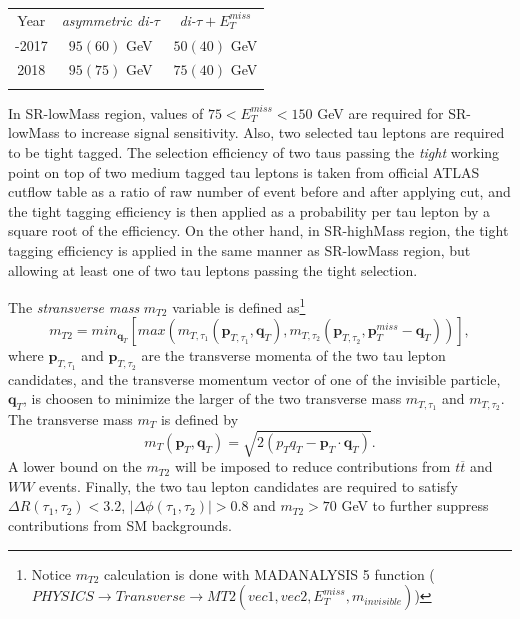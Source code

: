 \documentclass{ws-mpla}
\begin{document}
\begin{table}[h!]
  {\begin{tabular}{@{}c c c@{}} \toprule
  Year & \textit{asymmetric di-$\tau$} & \textit{di-$\tau +E^{miss}_T$} \\
  \colrule
 2015-2017 & $95(60)$ GeV & $50(40)$ GeV \\
 2018 & $95(75)$ GeV & $75(40)$ GeV \\ 
  \botrule
  \end{tabular}\label{tab:trig-eff} }
\end{table}

In SR-lowMass region, values of $75 < E^{miss}_T < 150$ GeV are required for SR-lowMass to increase signal sensitivity.
Also, two selected tau leptons are required to be tight tagged.
The selection efficiency of two taus passing the \textit{tight} working point on top of two medium tagged tau leptons is taken from official ATLAS cutflow table as a ratio of raw number of event before and after applying cut, and the tight tagging efficiency is then applied as a probability per tau lepton by a square root of the efficiency.
On the other hand, in SR-highMass region, the tight tagging efficiency is applied in the same manner as SR-lowMass region, but allowing at least one of two tau leptons passing the tight selection.

The \textit{stransverse mass} $m_{T2}$ variable is defined as\footnote{
Notice $m_{T2}$ calculation is done with MADANALYSIS 5 function ($PHYSICS\rightarrow Transverse\rightarrow MT2(vec1,vec2,E^{miss}_T,m_{invisible})$)
}
\begin{equation}
m_{T2} =min_{\mathbf{q}_T}
\left[
max(m_{T,\tau_1}(\mathbf{p}_{T,\tau_1},\mathbf{q}_T),m_{T,\tau_2}(\mathbf{p}_{T,\tau_2},\mathbf{p}^{miss}_T -\mathbf{q}_T))
\right],
\end{equation}   
where $\mathbf{p}_{T,\tau_1}$ and $\mathbf{p}_{T,\tau_2}$ are the transverse momenta of the two tau lepton candidates, and the transverse momentum vector of one of the invisible particle, $\mathbf{q}_T$, is choosen to minimize the larger of the two transverse mass $m_{T,\tau_1}$ and $m_{T,\tau_2}$. The transverse mass $m_T$ is defined by
\begin{equation}
m_{T}(\mathbf{p}_T,\mathbf{q}_T) = \sqrt{2(p_T q_T -\mathbf{p}_T\cdot\mathbf{q}_T)}.
\end{equation} 
A lower bound on the $m_{T2}$ will be imposed to reduce contributions from $t\overline{t}$ and $WW$ events.
Finally, the two tau lepton candidates are required to satisfy $\Delta R(\tau_1,\tau_2) < 3.2$, $|\Delta\phi (\tau_1,\tau_2)| > 0.8$ and $m_{T2} > 70$ GeV to further suppress contributions from SM backgrounds.
\end{document}
